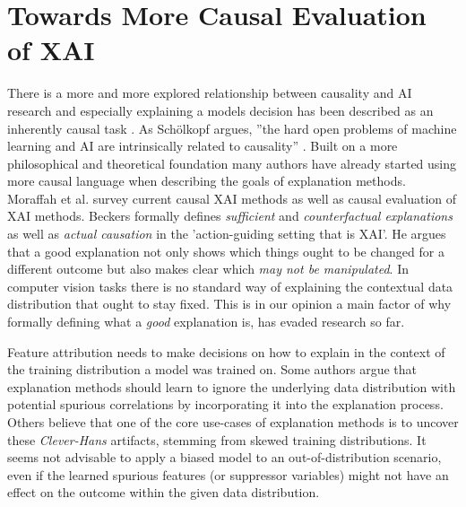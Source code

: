 \section{Towards More Causal Evaluation of XAI}\label{section:causal_xai}

There is a more and more explored relationship between causality and AI research and especially explaining a models decision has been described as an inherently causal task \cite{Moraffah2020a, Beckers2022, Halpern2005a}.
As Schölkopf argues, ''the hard open problems of machine learning and AI are intrinsically related to causality'' \cite{Schoelkopf2019}.
Built on a more philosophical and theoretical foundation \cite{Woodward2004, Halpern2005,Halpern2005a, Schoelkopf2019} many authors have already started using more causal language when describing the goals of explanation methods. Moraffah et al. \cite{Moraffah2020a} survey current causal XAI methods as well as causal evaluation of XAI methods.
Beckers \cite{Beckers2022} formally defines \textit{sufficient} and \textit{counterfactual explanations} as well as \textit{actual causation} in the 'action-guiding setting that is XAI'. He argues that a good explanation not only shows which things ought to be changed for a different outcome but also makes clear which \textit{may not be manipulated}. In computer vision tasks there is no standard way of explaining the contextual data distribution that ought to stay fixed. This is in our opinion a main factor of why formally defining what a \textit{good} explanation is, has evaded research so far. 

Feature attribution needs to make decisions on how to explain in the context of the training distribution a model was trained on.
Some authors \cite{Kindermans2017,Wilming2023, Wilming2022} argue that explanation methods should learn to ignore the underlying data distribution with potential spurious correlations by incorporating it into the explanation process. Others believe that one of the core use-cases of explanation methods is to uncover these \textit{Clever-Hans} artifacts, stemming from skewed training distributions. It seems not advisable to apply a biased model to an out-of-distribution scenario, even if the learned spurious features (or suppressor variables) might not have an effect on the outcome within the given data distribution.

